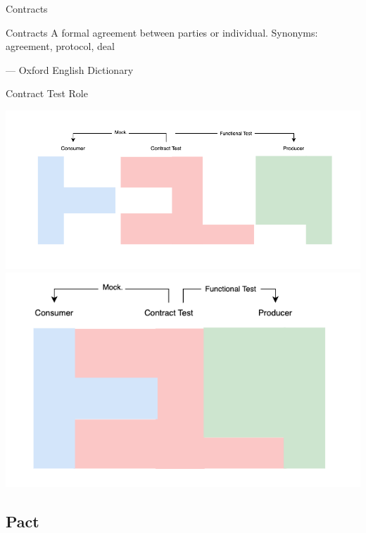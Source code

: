 

\begin{frame}{Contracts}

    \begin{block}{Contracts}
        A formal agreement between parties or individual. Synonyms: agreement, protocol, deal

        --- Oxford English Dictionary
    \end{block}

\end{frame}

\begin{frame}{Contract Test Role}
    \begin{center}
            \includegraphics[scale=.3]{./assets/contract_divided}
            \includegraphics[scale=.3]{./assets/contract_united}
    \end{center}
\end{frame}

\subsection{Pact}

